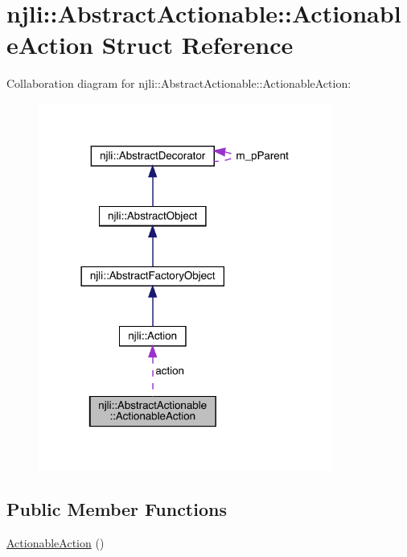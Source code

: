 \hypertarget{structnjli_1_1_abstract_actionable_1_1_actionable_action}{}\section{njli\+:\+:Abstract\+Actionable\+:\+:Actionable\+Action Struct Reference}
\label{structnjli_1_1_abstract_actionable_1_1_actionable_action}


Collaboration diagram for njli\+:\+:Abstract\+Actionable\+:\+:Actionable\+Action\+:\nopagebreak
\begin{figure}[H]
\begin{center}
\leavevmode
\includegraphics[width=273pt]{structnjli_1_1_abstract_actionable_1_1_actionable_action__coll__graph}
\end{center}
\end{figure}
\subsection*{Public Member Functions}
\begin{DoxyCompactItemize}
\item 
\mbox{\hyperlink{structnjli_1_1_abstract_actionable_1_1_actionable_action_ab9c1588b35748040376c7fd9af9b517b}{Actionable\+Action}} ()
\end{DoxyCompactItemize}
